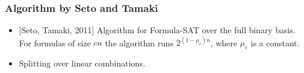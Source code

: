 \begin{frame}
    \frametitle{Algorithm by Seto and Tamaki}

	\begin{itemize}
		\item{} [Seto, Tamaki, 2011] Algorithm for Formula-SAT over the full binary
		    basis. For formulas of size $cn$ the algorithm runs $2^{(1 - \mu_c)n}$,
            where $\mu_c$ is a constant.
        \pause
		\item Splitting over linear combinations.
	\end{itemize}    
\end{frame}